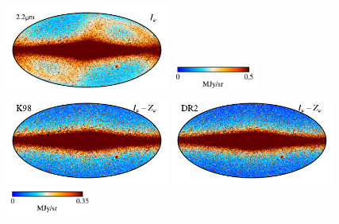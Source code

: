 \documentclass[twocolumn]{aa}
\begin{document}
\begin{figure}
    \includegraphics[height=2.90cm]{figs/compare_zsma/cosmoglobe_ma_02.pdf}%
    \includegraphics[width=2.90cm,angle=90]{figs/compare_zsma/cbar_tot_02.pdf}%
    \includegraphics[height=2.90cm]{figs/compare_zsma/dirbe_zsma_02.pdf}%
    \includegraphics[height=2.90cm]{figs/compare_zsma/cosmoglobe_zsma_02.pdf}%
    \includegraphics[width=2.90cm,angle=90]{figs/compare_zsma/cbar_02.pdf}%
    \\


\end{figure}
\end{document}
